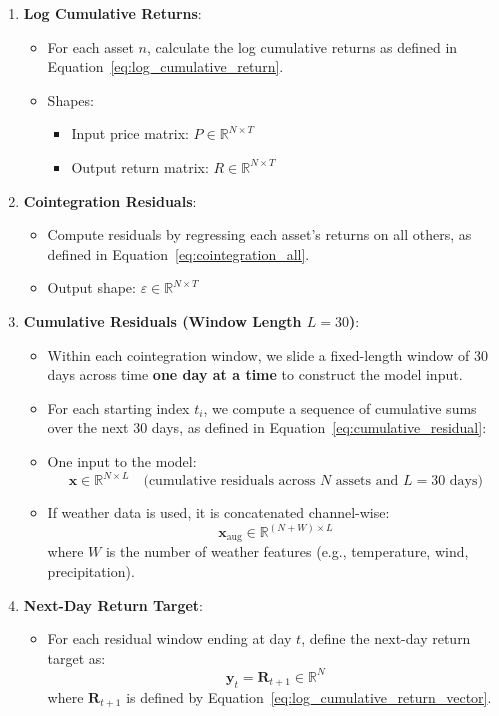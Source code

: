 \documentclass[12pt]{article}
\begin{document}
\begin{enumerate}
    \item \textbf{Log Cumulative Returns}:
    \begin{itemize}
        \item For each asset $n$, calculate the log cumulative returns as defined in Equation~\eqref{eq:log_cumulative_return}.
        \item Shapes:
        \begin{itemize}
            \item Input price matrix: $P \in \mathbb{R}^{N \times T}$
            \item Output return matrix: $R \in \mathbb{R}^{N \times T}$
        \end{itemize}
    \end{itemize}

    \item \textbf{Cointegration Residuals}:
    \begin{itemize}
        \item Compute residuals by regressing each asset’s returns on all others, as defined in Equation~\eqref{eq:cointegration_all}.
        \item Output shape: $\varepsilon \in \mathbb{R}^{N \times T}$
    \end{itemize}

    \item \textbf{Cumulative Residuals (Window Length $L = 30$)}:
    \begin{itemize}
        \item Within each cointegration window, we slide a fixed-length window of 30 days across time \textbf{one day at a time} to construct the model input.
        
        \item For each starting index $t_i$, we compute a sequence of cumulative sums over the next 30 days, as defined in Equation~\eqref{eq:cumulative_residual}:

                \item One input to the model:
        \[
        \mathbf{x} \in \mathbb{R}^{N \times L}
        \quad \text{(cumulative residuals across $N$ assets and $L = 30$ days)}
        \]

        \item If weather data is used, it is concatenated channel-wise:
        \[
        \mathbf{x}_{\text{aug}} \in \mathbb{R}^{(N + W) \times L}
        \]
        where $W$ is the number of weather features (e.g., temperature, wind, precipitation).
    \end{itemize}

    \item \textbf{Next-Day Return Target}:
    \begin{itemize}
        \item For each residual window ending at day $t$, define the next-day return target as:
        \[
        \mathbf{y}_t = \mathbf{R}_{t+1} \in \mathbb{R}^N
        \]
        where $\mathbf{R}_{t+1}$ is defined by Equation~\eqref{eq:log_cumulative_return_vector}.
    \end{itemize}
\end{enumerate}
\end{document}
